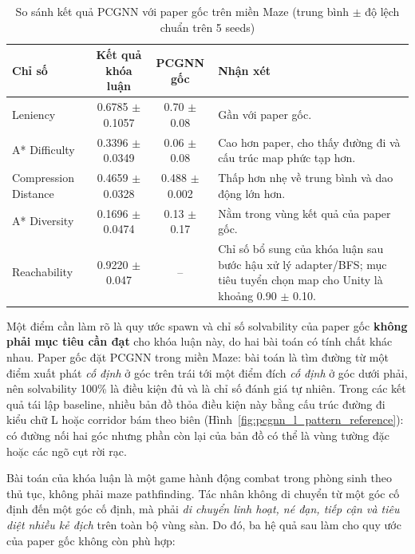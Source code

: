 \begin{table}[H]
    \centering
    \small
    \caption{So sánh kết quả PCGNN với paper gốc trên miền Maze (trung bình $\pm$ độ lệch chuẩn trên 5 seeds)}
    \label{tab:pcgnn_paper_comparison}
    \begin{tabular}{l c c p{5.8cm}}
        \toprule
        \textbf{Chỉ số} & \textbf{Kết quả khóa luận} & \textbf{PCGNN gốc} & \textbf{Nhận xét} \\
        \midrule
        Leniency & 0.6785 $\pm$ 0.1057 & 0.70 $\pm$ 0.08 & Gần với paper gốc. \\
        A* Difficulty & 0.3396 $\pm$ 0.0349 & 0.06 $\pm$ 0.08 & Cao hơn paper, cho thấy đường đi và cấu trúc map phức tạp hơn. \\
        Compression Distance & 0.4659 $\pm$ 0.0328 & 0.488 $\pm$ 0.002 & Thấp hơn nhẹ về trung bình và dao động lớn hơn. \\
        A* Diversity & 0.1696 $\pm$ 0.0474 & 0.13 $\pm$ 0.17 & Nằm trong vùng kết quả của paper gốc. \\
        Reachability & 0.9220 $\pm$ 0.047 & -- & Chỉ số bổ sung của khóa luận sau bước hậu xử lý adapter/BFS; mục tiêu tuyển chọn map cho Unity là khoảng 0.90 $\pm$ 0.10. \\
        \bottomrule
    \end{tabular}
\end{table}

Một điểm cần làm rõ là quy ước spawn và chỉ số solvability của paper gốc \textbf{không phải mục tiêu cần đạt} cho khóa luận này, do hai bài toán có tính chất khác nhau. Paper gốc đặt PCGNN trong miền Maze: bài toán là tìm đường từ một điểm xuất phát \emph{cố định} ở góc trên trái tới một điểm đích \emph{cố định} ở góc dưới phải, nên solvability 100\% là điều kiện đủ và là chỉ số đánh giá tự nhiên. Trong các kết quả tái lập baseline, nhiều bản đồ thỏa điều kiện này bằng cấu trúc đường đi kiểu chữ L hoặc corridor bám theo biên (Hình~\ref{fig:pcgnn_l_pattern_reference}): có đường nối hai góc nhưng phần còn lại của bản đồ có thể là vùng tường đặc hoặc các ngõ cụt rời rạc.

Bài toán của khóa luận là một game hành động combat trong phòng sinh theo thủ tục, không phải maze pathfinding. Tác nhân không di chuyển từ một góc cố định đến một góc cố định, mà phải \emph{di chuyển linh hoạt, né đạn, tiếp cận và tiêu diệt nhiều kẻ địch} trên toàn bộ vùng sàn. Do đó, ba hệ quả sau làm cho quy ước của paper gốc không còn phù hợp:

